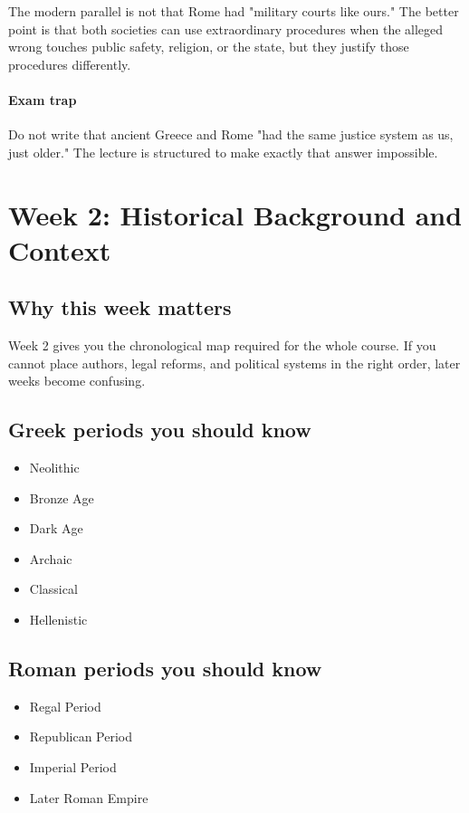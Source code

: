 \documentclass[11pt]{article}
\begin{document}
The modern parallel is not that Rome had "military courts like ours." The better point is that both societies can use extraordinary procedures when the alleged wrong touches public safety, religion, or the state, but they justify those procedures differently.

\paragraph{Exam trap}

Do not write that ancient Greece and Rome "had the same justice system as us, just older." The lecture is structured to make exactly that answer impossible.

\section{Week 2: Historical Background and Context}

\subsection{Why this week matters}

Week 2 gives you the chronological map required for the whole course. If you cannot place authors, legal reforms, and political systems in the right order, later weeks become confusing.

\subsection{Greek periods you should know}

\begin{itemize}
\item Neolithic
\item Bronze Age
\item Dark Age
\item Archaic
\item Classical
\item Hellenistic
\end{itemize}

\subsection{Roman periods you should know}

\begin{itemize}
\item Regal Period
\item Republican Period
\item Imperial Period
\item Later Roman Empire
\end{itemize}
\end{document}
